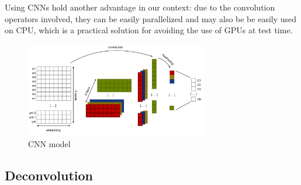 Using CNNs hold another advantage in our context: due to the convolution operators involved, they can be easily parallelized and may also be be easily used on CPU, 
which is a practical solution for avoiding the use of GPUs at test time. 


\begin{figure}[h]
\begin{center}
\includegraphics[width=8cm]{img/model_classif2.png}
\caption{CNN model}
\label{cnn}
\end{center}
\end{figure}

\subsection{Deconvolution}

